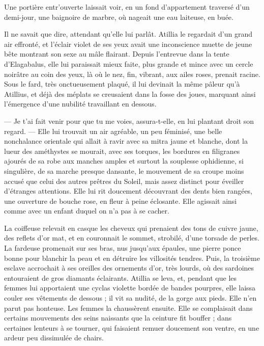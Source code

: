 \documentclass[a4paper, 11pt, oneside, polutonikogreek, french]{article}
\begin{document}
Une portière entr'ouverte laissait voir, en un fond d'appartement traversé d'un demi-jour, une baignoire de marbre, où nageait une eau laiteuse, en buée.

Il ne savait que dire, attendant qu'elle lui parlât. Atillia le regardait d'un grand air effronté, et l'éclair violet de ses yeux avait une inconscience muette de jeune bête montrant son sexe au mâle flairant. Depuis l'entrevue dans la tente d'Elagabalus, elle lui paraissait mieux faite, plus grande et mince avec un cercle noirâtre au coin des yeux, là où le nez, fin, vibrant, aux ailes roses, prenait racine. Sous le fard, très onctueusement plaqué, il lui devinait la même pâleur qu'à Atillius, et déjà des méplats se creusaient dans la fosse des joues, marquant ainsi l'émergence d'une nubilité travaillant en dessous.

--- Je t'ai fait venir pour que tu me voies, assura-t-elle, en lui plantant droit son regard. --- Elle lui trouvait un air agréable, un peu féminisé, une belle nonchalance orientale qui allait à ravir avec sa mitra jaune et blanche, dont la lueur des améthystes se mourait, avec ses torques, les bordures en filigranes ajourés de sa robe aux manches amples et surtout la souplesse ophidienne, si singulière, de sa marche presque dansante, le mouvement de sa croupe moins accusé que celui des autres prêtres du Soleil, mais assez distinct pour éveiller d'étranges attentions. Elle lui rit doucement découvrant des dents bien rangées, une ouverture de bouche rose, en fleur à peine éclosante. Elle agissait ainsi comme avec un enfant duquel on n'a pas à se cacher.

La coiffeuse relevait en casque les cheveux qui prenaient des tons de cuivre jaune, des reflets d'or mat, et en couronnait le sommet, strobilé, d'une torsade de perles. La fardeuse promenait sur ses bras, nus jusqu'aux épaules, une pierre ponce bonne pour blanchir la peau et en détruire les villosités tendres. Puis, la troisième esclave accrochait à ses oreilles des ornements d'or, très lourds, où des sardoines entouraient de gros diamants éclairants. Atillia se leva, et, pendant que les femmes lui apportaient une cyclas violette bordée de bandes pourpres, elle laissa couler ses vêtements de dessous ; il vit sa nudité, de la gorge aux pieds. Elle n'en parut pas honteuse. Les femmes la chaussèrent ensuite. Elle se complaisait dans certains mouvements des seins naissants que la ceinture fit bouffer ; dans certaines lenteurs à se tourner, qui faisaient remuer doucement son ventre, en une ardeur peu dissimulée de chairs.
\end{document}
